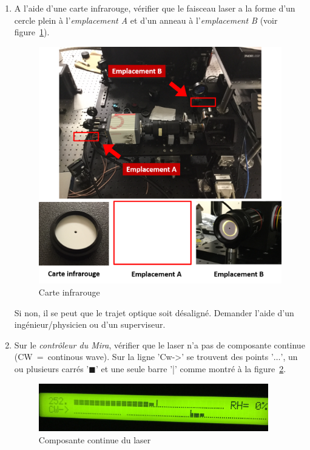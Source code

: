 \begin{enumerate}
   \item A l'aide d'une carte infrarouge, vérifier que le faisceau laser a la forme d'un cercle plein à l'\textit{emplacement A} et d'un anneau à l'\textit{emplacement B} (voir figure~\ref{fig:carte}).
        \begin{figure}[H]
        \centering
        \includegraphics[width=13cm]{carte.png}
        \caption{Carte infrarouge}
        \label{fig:carte}
        \end{figure}
    Si non, il se peut que le trajet optique soit désaligné. Demander l'aide d'un ingénieur/physicien ou d'un superviseur.
   \item Sur le \textit{contrôleur du Mira}, vérifier que le laser n'a pas de composante continue (CW~=~continous wave). Sur la ligne 'Cw->' se trouvent des points '$\ldots$', un ou plusieurs carrés '$\blacksquare$' et une seule barre '|' comme montré à la figure~\ref{fig:cw}.
        \begin{figure}[H]
        \centering
        \includegraphics[width=10cm]{cw.jpg}
        \caption{Composante continue du laser}
        \label{fig:cw}
        \end{figure}

\end{enumerate}
